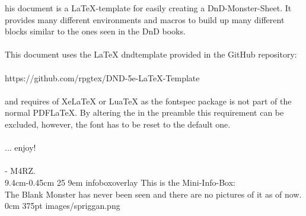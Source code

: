 \documentclass[letterpaper,openany,oneside,twocolumn]{book}
\begin{document}

\mainmatter%



\entryfont \noindent {}his document is a LaTeX-template for easily creating a DnD-Monster-Sheet. It provides many different environments and macros to build up many different blocks similar to the ones seen in the DnD books.\\\\
This document uses the LaTeX dnd\textunderscore template provided in the GitHub repository:\\\\ https://github.com/rpgtex/DND-5e-LaTeX-Template\\\\ and requires of XeLaTeX or LuaTeX as the fontspec package is not part of the normal PDFLaTeX. By altering the \entryfont in the preamble this requirement can be excluded, however, the font has to be reset to the default one. \\\\
... enjoy!\\\\
- M4RZ.\\

\MonsterGraphicAndShortInfo%
	{9.4cm}{-0.45cm}%
	{25}%
	{9em}%
	{infoboxoverlay} %
	{This is the Mini-Info-Box:\\The Blank Monster has never been seen and there are no pictures of it as of now.}%
	{0cm}%
	{375pt}%
	{images/spriggan.png}%
\end{document}
